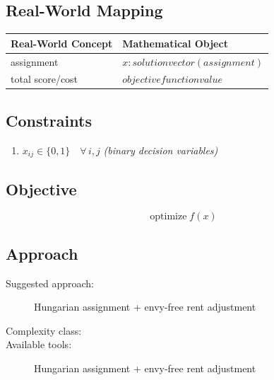 \documentclass[11pt, a4paper]{article}
\begin{document}
\subsection{Real-World Mapping}

\begin{longtable}{ll}
\toprule
\textbf{Real-World Concept} & \textbf{Mathematical Object} \\
\midrule
\endhead
assignment & $x: solution vector (assignment)$ \\
total score/cost & $objective function value$ \\
\bottomrule
\end{longtable}

\subsection{Constraints}

\begin{enumerate}
  \item $x_{ij} \in \{0, 1\} \quad \forall\, i, j$
  \hfill \textit{(binary decision variables)}
\end{enumerate}

\subsection{Objective}

\begin{equation}
\text{optimize} \; f(x)
\end{equation}

\subsection{Approach}

\begin{description}
  \item[Suggested approach:] Hungarian assignment + envy-free rent adjustment
  \item[Complexity class:] 
  \item[Available tools:] Hungarian assignment + envy-free rent adjustment
\end{description}
\end{document}
